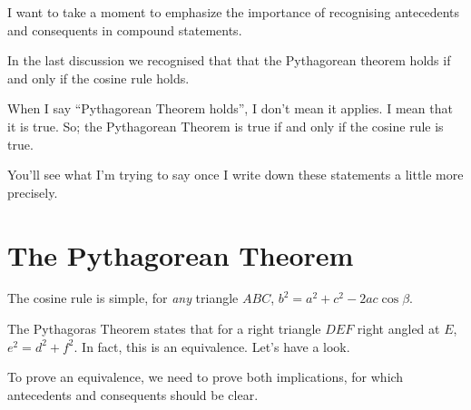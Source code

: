 

I want to take a moment to emphasize the importance of recognising antecedents and consequents in compound statements.

In the last discussion we recognised that that the Pythagorean theorem holds if and only if the cosine rule holds.

When I say ``Pythagorean Theorem holds'', I don't mean it applies. I mean that it is true. So; the Pythagorean Theorem is true if and only if the cosine rule is true.

You'll see what I'm trying to say once I write down these statements a little more precisely.

\section*{The Pythagorean Theorem}
The cosine rule is simple, for \textit{any} triangle $ABC$, $b^2 = a^2 + c^2 -2ac\cos\beta$.

The Pythagoras Theorem states that for a right triangle $DEF$ right angled at $E$, $e^2 = d^2 + f^2$. In fact, this is an equivalence. Let's have a look.

To prove an equivalence, we need to prove both implications, for which antecedents and consequents should be clear.

